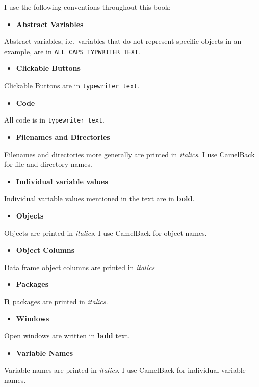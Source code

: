 I use the following conventions throughout this book:

\begin{itemize}
\item
  \textbf{Abstract Variables}
\end{itemize}
Abstract variables, i.e.~variables that do not represent specific
objects in an example, are in \texttt{ALL CAPS TYPWRITER TEXT}.

\begin{itemize}
\item
  \textbf{Clickable Buttons}
\end{itemize}
Clickable Buttons are in \texttt{typewriter text}.

\begin{itemize}
\item
  \textbf{Code}
\end{itemize}
All code is in \texttt{typewriter text}.

\begin{itemize}
\item
  \textbf{Filenames and Directories}
\end{itemize}
Filenames and directories more generally are printed in \emph{italics}.
I use CamelBack for file and directory names.

\begin{itemize}
\item
  \textbf{Individual variable values}
\end{itemize}
Individual variable values mentioned in the text are in \textbf{bold}.

\begin{itemize}
\item
  \textbf{Objects}
\end{itemize}
Objects are printed in \emph{italics}. I use CamelBack for object names.

\begin{itemize}
\item
  \textbf{Object Columns}
\end{itemize}
Data frame object columns are printed in \emph{italics}

\begin{itemize}
\item
  \textbf{Packages}
\end{itemize}
\textbf{R} packages are printed in \emph{italics}.

\begin{itemize}
\item
  \textbf{Windows}
\end{itemize}
Open windows are written in \textbf{bold} text.

\begin{itemize}
\item
  \textbf{Variable Names}
\end{itemize}
Variable names are printed in \emph{italics}. I use CamelBack for
individual variable names.
